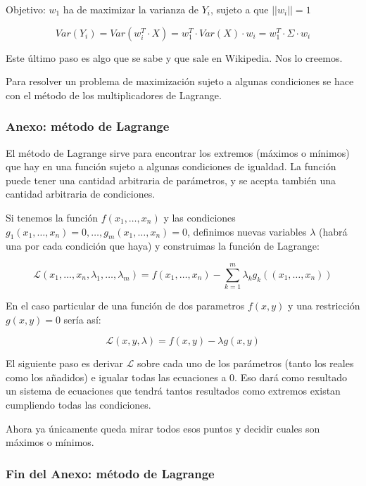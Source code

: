 \documentclass[a4paper,10pt]{article}
\begin{document}
Objetivo: $w_1$ ha de maximizar la varianza de $Y_i$, sujeto a que $||w_i|| = 1$

\begin{equation*}
  Var(Y_i) = Var(w_i^T \cdot X) = w_1^T \cdot Var(X) \cdot w_i = w_1^T \cdot \Sigma \cdot w_i
\end{equation*}

Este último paso es algo que se sabe y que sale en Wikipedia. Nos lo creemos.

Para resolver un problema de maximización sujeto a algunas condiciones se hace con el método de los multiplicadores de Lagrange.

\subsubsection*{Anexo: método de Lagrange}
El método de Lagrange sirve para encontrar los extremos (máximos o mínimos) que hay en una función sujeto a algunas condiciones de igualdad. La función puede tener una cantidad arbitraria de parámetros, y se acepta también una cantidad arbitraria de condiciones.

Si tenemos la función $f(x_1,\dots,x_n)$ y las condiciones $g_1(x_1,\dots,x_n) = 0, \dots, g_m(x_1,\dots,x_n) = 0$, definimos nuevas variables $\lambda$ (habrá una por cada condición que haya) y construimas la función de Lagrange:

\begin{equation*}
  \mathcal{L}(x_1,\dots,x_n,\lambda_1,\dots, \lambda_m) = f(x_1,\dots,x_n) - \sum_{k = 1}^{m} \lambda_kg_k((x_1,\dots,x_n))
\end{equation*}

En el caso particular de una función de dos parametros $f(x,y)$ y una restricción $g(x,y) = 0$ sería así:

\begin{equation*}
  \mathcal{L}(x,y,\lambda) = f(x,y) - \lambda g(x,y)
\end{equation*}

El siguiente paso es derivar $\mathcal{L}$ sobre cada uno de los parámetros (tanto los reales como los añadidos) e igualar todas las ecuaciones a $0$. Eso dará como resultado un sistema de ecuaciones que tendrá tantos resultados como extremos existan cumpliendo todas las condiciones.

Ahora ya únicamente queda mirar todos esos puntos y decidir cuales son máximos o mínimos.

\subsubsection*{Fin del Anexo: método de Lagrange}
\end{document}
